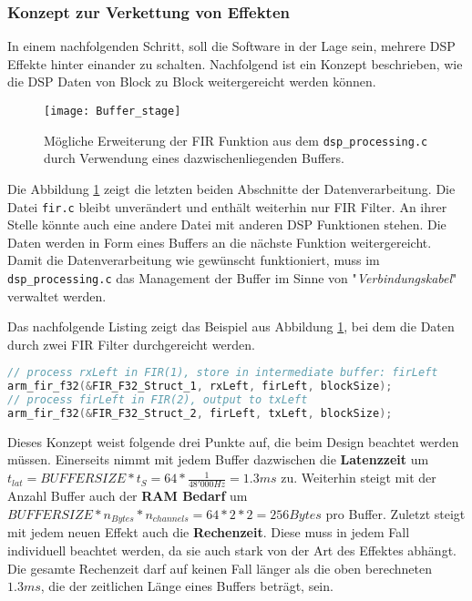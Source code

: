 \subsubsection{Konzept zur Verkettung von Effekten}
\label{sec:DSPChaining}

In einem nachfolgenden Schritt, soll die Software in der Lage sein, mehrere DSP Effekte hinter einander zu schalten. Nachfolgend ist ein Konzept beschrieben, wie die DSP Daten von Block zu Block weitergereicht werden können.

\begin{figure}[H]
	\centering
	\texttt{[image: Buffer\_stage]}
	\caption{Mögliche Erweiterung der FIR Funktion aus dem \texttt{dsp\_processing.c} durch Verwendung eines dazwischenliegenden Buffers.}
	\label{pic:Buffer_stage}
\end{figure}

Die Abbildung \ref{pic:Buffer_stage} zeigt die letzten beiden Abschnitte der Datenverarbeitung. Die Datei \texttt{fir.c} bleibt unverändert und enthält weiterhin nur FIR Filter. An ihrer Stelle könnte auch eine andere Datei mit anderen DSP Funktionen stehen.
Die Daten werden in Form eines Buffers an die nächste Funktion weitergereicht.
Damit die Datenverarbeitung wie gewünscht funktioniert, muss im \texttt{dsp\_processing.c} das Management der Buffer im Sinne von "\textit{Verbindungskabel}" verwaltet werden.

Das nachfolgende Listing zeigt das Beispiel aus Abbildung \ref{pic:Buffer_stage}, bei dem die Daten durch zwei FIR Filter durchgereicht werden.

\begin{lstlisting}[language=c]
// process rxLeft in FIR(1), store in intermediate buffer: firLeft
arm_fir_f32(&FIR_F32_Struct_1, rxLeft, firLeft, blockSize);
// process firLeft in FIR(2), output to txLeft
arm_fir_f32(&FIR_F32_Struct_2, firLeft, txLeft, blockSize);

\end{lstlisting}

Dieses Konzept weist folgende drei Punkte auf, die beim Design beachtet werden müssen.
Einerseits nimmt mit jedem Buffer dazwischen die \textbf{Latenzzeit} um $t_{lat}=BUFFERSIZE*t_S=64*\frac{1}{48'000\si{Hz}}=1.3\si{ms}$ zu.
Weiterhin steigt mit der Anzahl Buffer auch der \textbf{RAM Bedarf} um $BUFFERSIZE*n_{Bytes}*n_{channels}=64*2*2=256\si{Bytes}$ pro Buffer.
Zuletzt steigt mit jedem neuen Effekt auch die \textbf{Rechenzeit}. Diese muss in jedem Fall individuell beachtet werden, da sie auch stark von der Art des Effektes abhängt.
Die gesamte Rechenzeit darf auf keinen Fall länger als die oben berechneten $1.3\si{ms}$, die der zeitlichen Länge eines Buffers beträgt, sein.



